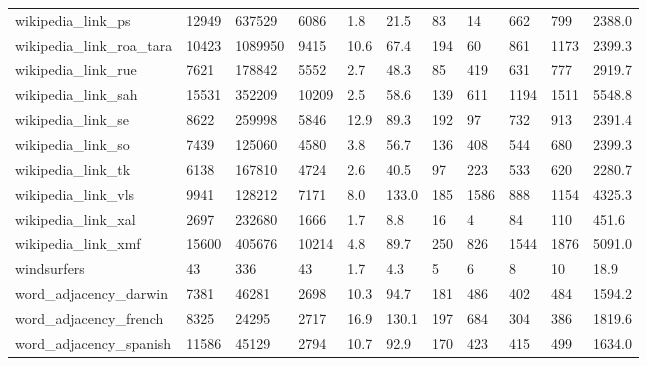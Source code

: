 \begin{longtable}{lllllllllll}
 wikipedia\_link\_ps                                  & 12949      & 637529    & 6086  & 1.8    & 21.5   & 83    & 14     & 662    & 799    & 2388.0  \\
 wikipedia\_link\_roa\_tara                            & 10423      & 1089950   & 9415  & 10.6   & 67.4   & 194   & 60     & 861    & 1173   & 2399.3  \\
 wikipedia\_link\_rue                                 & 7621       & 178842    & 5552  & 2.7    & 48.3   & 85    & 419    & 631    & 777    & 2919.7  \\
 wikipedia\_link\_sah                                 & 15531      & 352209    & 10209 & 2.5    & 58.6   & 139   & 611    & 1194   & 1511   & 5548.8  \\
 wikipedia\_link\_se                                  & 8622       & 259998    & 5846  & 12.9   & 89.3   & 192   & 97     & 732    & 913    & 2391.4  \\
 wikipedia\_link\_so                                  & 7439       & 125060    & 4580  & 3.8    & 56.7   & 136   & 408    & 544    & 680    & 2399.3  \\
 wikipedia\_link\_tk                                  & 6138       & 167810    & 4724  & 2.6    & 40.5   & 97    & 223    & 533    & 620    & 2280.7  \\
 wikipedia\_link\_vls                                 & 9941       & 128212    & 7171  & 8.0    & 133.0  & 185   & 1586   & 888    & 1154   & 4325.3  \\
 wikipedia\_link\_xal                                 & 2697       & 232680    & 1666  & 1.7    & 8.8    & 16    & 4      & 84     & 110    & 451.6   \\
 wikipedia\_link\_xmf                                 & 15600      & 405676    & 10214 & 4.8    & 89.7   & 250   & 826    & 1544   & 1876   & 5091.0  \\
 windsurfers                                        & 43         & 336       & 43    & 1.7    & 4.3    & 5     & 6      & 8      & 10     & 18.9    \\
 word\_adjacency\_darwin                              & 7381       & 46281     & 2698  & 10.3   & 94.7   & 181   & 486    & 402    & 484    & 1594.2  \\
 word\_adjacency\_french                              & 8325       & 24295     & 2717  & 16.9   & 130.1  & 197   & 684    & 304    & 386    & 1819.6  \\
 word\_adjacency\_spanish                             & 11586      & 45129     & 2794  & 10.7   & 92.9   & 170   & 423    & 415    & 499    & 1634.0  \\

\end{longtable}
